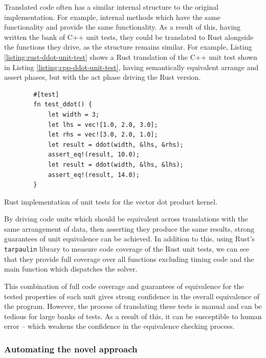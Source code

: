 Translated code often has a similar internal structure to the original implementation. For example, internal methods which have the same functionality and provide the same functionality. As a result of this, having written the bank of C++ unit tests, they could be translated to Rust alongside the functions they drive, as the structure remains similar. For example, Listing \ref{listing:rust-ddot-unit-test} shows a Rust translation of the C++ unit test shown in Listing \ref{listing:cpp-ddot-unit-test}, having semantically equivalent arrange and assert phases, but with the act phase driving the Rust version.

\begin{listing}[H]
    \begin{verbatim}
        #[test]
        fn test_ddot() {
            let width = 3;
            let lhs = vec![1.0, 2.0, 3.0];
            let rhs = vec![3.0, 2.0, 1.0];
            let result = ddot(width, &lhs, &rhs);
            assert_eq!(result, 10.0);
            let result = ddot(width, &lhs, &lhs);
            assert_eq!(result, 14.0);
        }
    \end{verbatim}
    \caption{Rust implementation of unit tests for the vector dot product kernel.}
    \label{listing:rust-ddot-unit-test}
\end{listing}

By driving code units which should be equivalent across translations with the same arrangement of data, then asserting they produce the same results, strong guarantees of unit equivalence can be achieved. In addition to this, using Rust's \texttt{tarpaulin} library \cite{xd009642Xd009642Tarpaulin2024} to measure code coverage of the Rust unit tests, we can see that they provide full coverage over all functions excluding timing code and the main function which dispatches the solver. 

This combination of full code coverage and guarantees of equivalence for the tested properties of each unit gives strong confidence in the overall equivalence of the program. However, the process of translating these tests is manual and can be tedious for large banks of tests. As a result of this, it can be susceptible to human error -- which weakens the confidence in the equivalence checking process.

\subsubsection{Automating the novel approach}
\label{sssec:equivalence-polyglotest-automation}

